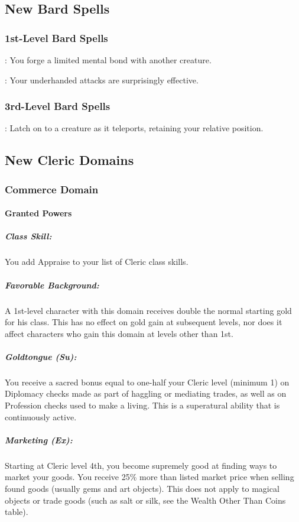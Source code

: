 \subsection{New Bard Spells}
\subsubsection{1st-Level Bard Spells}
\begin{list}{}{\leftmargin=1em}
 \item {}: You forge a limited mental bond with another creature.
 \item {}: Your underhanded attacks are surprisingly effective.
\end{list}
\subsubsection{3rd-Level Bard Spells}
\begin{list}{}{\leftmargin=1em}
 \item {}: Latch on to a creature as it teleports, retaining your relative position.
\end{list}

\subsection{New Cleric Domains}
\label{sec:NewClericDomains}
\subsubsection{Commerce Domain}
\label{sec:CommerceDomain}
\paragraph{Granted Powers}
\subparagraph{Class Skill:}
You add Appraise to your list of Cleric class skills.
\subparagraph{Favorable Background:} A 1st-level character with this domain receives double the normal starting gold for his class. This has no effect on gold gain at subsequent levels, nor does it affect characters who gain this domain at levels other than 1st.
\subparagraph{Goldtongue (Su):}
You receive a sacred bonus equal to one-half your Cleric level (minimum 1) on Diplomacy checks made as part of haggling or mediating trades, as well as on Profession checks used to make a living.
This is a superatural ability that is continuously active.
\subparagraph{Marketing (Ex):}
Starting at Cleric level 4th, you become supremely good at finding ways to market your goods. You receive 25\% more than listed market price when selling found goods (usually gems and art objects). This does not apply to magical objects or trade goods (such as salt or silk, see the Wealth Other Than Coins table).

